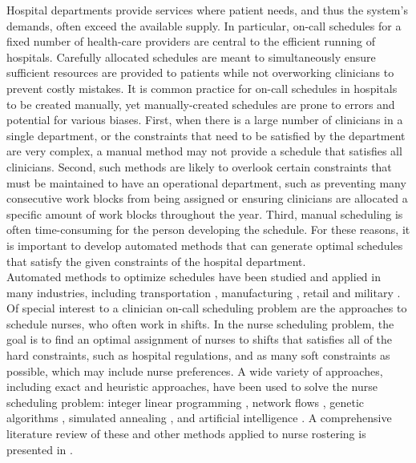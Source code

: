 Hospital departments provide services where patient needs, and thus the system's demands, often exceed the available supply. In particular, on-call schedules for a fixed number of health-care providers are central to the efficient running of hospitals. Carefully allocated schedules are meant to simultaneously ensure sufficient resources are provided to patients while not overworking clinicians to prevent costly mistakes. It is common practice for on-call schedules in hospitals to be created manually, yet manually-created schedules are prone to errors and potential for various biases. First, when there is a large number of clinicians in a single department, or the constraints that need to be satisfied by the department are very complex, a manual method may not provide a schedule that satisfies all clinicians. Second, such methods are likely to overlook certain constraints that must be maintained to have an operational department, such as preventing many consecutive work blocks from being assigned or ensuring clinicians are allocated a specific amount of work blocks throughout the year. Third, manual scheduling is often time-consuming for the person developing the schedule. For these reasons, it is important to develop automated methods that can generate optimal schedules that satisfy the given constraints of the hospital department. \\

Automated methods to optimize schedules have been studied and applied in many industries, including transportation \cite{aickelin_improved_2006, goel_truck_2012, gunther_combined_2010}, manufacturing \cite{al-yakoob_mixed-integer_2007, al-yakoob_column_2008, alfares_simulation_2007}, retail \cite{chapados_retail_2011, nissen_automatic_2010} and military \cite{horn_scheduling_2007, laguna_modeling_2005}. Of special interest to a clinician on-call scheduling problem are the approaches to schedule nurses, who often work in shifts. In the nurse scheduling problem, the goal is to find an optimal assignment of nurses to shifts that satisfies all of the hard constraints, such as hospital regulations, and as many soft constraints as possible, which may include nurse preferences. A wide variety of approaches, including exact and heuristic approaches, have been used to solve the nurse scheduling problem: integer linear programming \cite{azaiez_0-1_2005, trilling_nurse_2006, widyastiti_nurses_2016}, network flows \cite{el_adoly_new_2018}, genetic algorithms \cite{aickelin_exploiting_2000, jan_evolutionary_2000, kawanaka_genetic_2001}, simulated annealing \cite{jaszkiewicz_metaheuristic_1997}, and artificial intelligence \cite{abdennadher_nurse_nodate, li_hybrid_2003}. A comprehensive literature review of these and other methods applied to nurse rostering is presented in \cite{burke_state_2004}. \\

